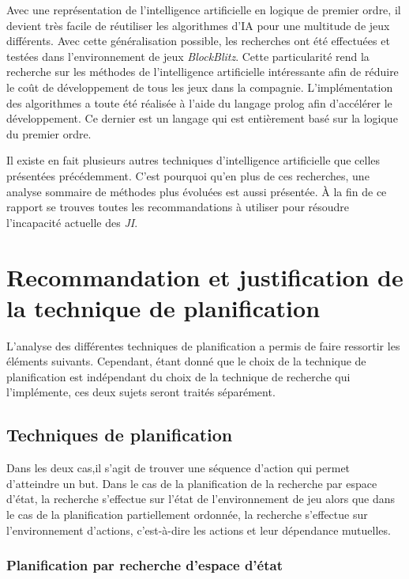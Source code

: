 \documentclass[12pt,english,frenchb,letterpaper]{article}
\begin{document}
Avec une représentation de l'intelligence artificielle en logique de premier ordre, il devient très facile de réutiliser les algorithmes d'IA pour une multitude de jeux différents. Avec cette généralisation possible, les recherches ont été effectuées et testées dans l'environnement de jeux \textit{BlockBlitz}. Cette particularité rend la recherche sur les méthodes de l'intelligence artificielle intéressante afin de réduire le coût de développement de tous les jeux dans la compagnie. L'implémentation des algorithmes a toute été réalisée à l'aide du langage prolog afin d'accélérer le développement. Ce dernier est un langage qui est entièrement basé sur la logique du premier ordre.

Il existe en fait plusieurs autres techniques d'intelligence artificielle que celles présentées précédemment. C'est pourquoi qu'en plus de ces recherches, une analyse sommaire de méthodes plus évoluées est aussi présentée. À la fin de ce rapport se trouves toutes les recommandations à utiliser pour résoudre l'incapacité actuelle des \textit{JI}.


\section{Recommandation et justification de la technique de planification}
L'analyse des différentes techniques de planification a permis de faire ressortir les éléments suivants.  Cependant, étant donné que le choix de la technique de planification est indépendant du choix de la technique de recherche qui l'implémente, ces deux sujets seront traités séparément.

\subsection{Techniques de planification}
Dans les deux cas,il s'agit de trouver une séquence d'action qui permet d'atteindre un but. Dans le cas de la planification de la recherche par espace d'état, la recherche s'effectue sur l'état de l'environnement de jeu alors que dans le cas de la planification partiellement ordonnée, la recherche s'effectue sur l'environnement d'actions, c'est-à-dire les actions et leur dépendance mutuelles. 

\subsubsection{Planification par recherche d'espace d'état}
\end{document}
